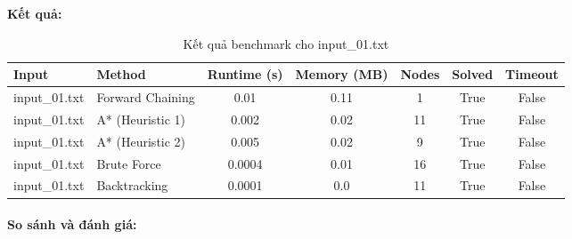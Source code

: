 \textbf{Kết quả:}
\begin{table}[H]
\centering
\begin{tabular}{|l|l|c|c|c|c|c|}
\hline
\textbf{Input} & \textbf{Method} & \textbf{Runtime (s)} & \textbf{Memory (MB)} & \textbf{Nodes} & \textbf{Solved} & \textbf{Timeout} \\
\hline
input\_01.txt & Forward Chaining & 0.01 & 0.11 & 1 & True & False \\
input\_01.txt & A* (Heuristic 1) & 0.002 & 0.02 & 11 & True & False \\
input\_01.txt & A* (Heuristic 2) & 0.005 & 0.02 & 9 & True & False \\
input\_01.txt & Brute Force & 0.0004 & 0.01 & 16 & True & False \\
input\_01.txt & Backtracking & 0.0001 & 0.0 & 11 & True & False \\
\hline
\end{tabular}
\caption{Kết quả benchmark cho input\_01.txt}
\end{table}

\paragraph{So sánh và đánh giá:}

